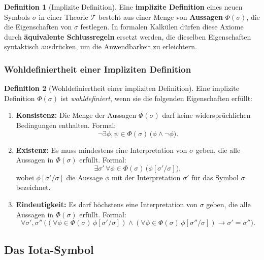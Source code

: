 \documentclass{book}
\theoremstyle{plain}
\theoremstyle{remark}
\theoremstyle{definition}
\newtheorem{definition}{Definition}[section]
\begin{document}
\begin{definition}[Implizite Definition]
Eine \textbf{implizite Definition} eines neuen Symbols \(\sigma\) in einer Theorie \(\mathcal{T}\) besteht aus einer Menge von \textbf{Aussagen} \(\Phi(\sigma)\), die die Eigenschaften von \(\sigma\) festlegen.
In formalen Kalkülen dürfen diese Axiome durch \textbf{äquivalente Schlussregeln} ersetzt werden, die dieselben Eigenschaften syntaktisch ausdrücken, um die Anwendbarkeit zu erleichtern.

\end{definition}

\subsubsection{Wohldefiniertheit einer Impliziten Definition}

\begin{definition}[Wohldefiniertheit einer impliziten Definition]
Eine implizite Definition \(\Phi(\sigma)\) ist \emph{wohldefiniert}, wenn sie die folgenden Eigenschaften erfüllt:
\begin{enumerate}
    \item \textbf{Konsistenz:} Die Menge der Aussagen \(\Phi(\sigma)\) darf keine widersprüchlichen Bedingungen enthalten. Formal:
    \[
    \neg \exists \phi, \psi \in \Phi(\sigma) \, \bigl( \phi \land \neg \phi \bigr).
    \]

    \item \textbf{Existenz:} Es muss mindestens eine Interpretation von \(\sigma\) geben, die alle Aussagen in \(\Phi(\sigma)\) erfüllt. Formal:
    \[
    \exists \sigma' \, \forall \phi \in \Phi(\sigma) \, \bigl( \phi[\sigma' / \sigma] \bigr),
    \]
    wobei \(\phi[\sigma' / \sigma]\) die Aussage \(\phi\) mit der Interpretation \(\sigma'\) für das Symbol \(\sigma\) bezeichnet.

    \item \textbf{Eindeutigkeit:} Es darf höchstens eine Interpretation von \(\sigma\) geben, die alle Aussagen in \(\Phi(\sigma)\) erfüllt. Formal:
    \[
    \forall \sigma', \sigma'' \, \bigl( (\forall \phi \in \Phi(\sigma) \, \phi[\sigma' / \sigma]) \land (\forall \phi \in \Phi(\sigma) \, \phi[\sigma'' / \sigma]) \rightarrow \sigma' = \sigma'' \bigr).
    \]
\end{enumerate}
\end{definition}

\subsection{Das Iota-Symbol}
\end{document}
